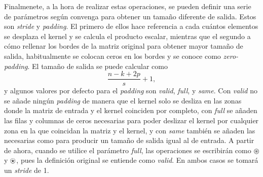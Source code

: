 		Finalmenete, a la hora de realizar estas operaciones, se pueden definir una serie de parámetros según convenga para obtener un tamaño diferente de salida\cite{introCNN}. Estos son \textit{stride} y \textit{padding}. El primero de ellos hace referencia a cada cuántos elementos se desplaza el kernel y se calcula el producto escalar, mientras que el segundo a cómo rellenar los bordes de la matriz original para obtener mayor tamaño de salida, habitualmente se colocan ceros en los bordes y se conoce como \textit{zero-padding}. El tamaño de salida se puede calcular como 
		$$
		\frac{n-k+2p}{s}+1, 
		$$
		y algunos valores por defecto para el \textit{padding} son \textit{valid},  \textit{full}, y \textit{same}. Con \textit{valid} no se añade ningún \textit{padding} de manera que el kernel solo se desliza en las zonas donde la matriz de entrada y el kernel coinciden por completo, con \textit{full} se añaden las filas y columnas de ceros necesarias para poder deslizar el kernel por cualquier zona en la que coincidan la matriz y el kernel, y con \textit{same} también se añaden las necesarias como para producir un tamaño de salida igual al de entrada. A partir de ahora, cuando se utilice el parámetro \textit{full}, las operaciones se escribirán como $\circledast$ y $\ostar$, pues la definición original se entiende como \textit{valid}. En ambos casos se tomará un \textit{stride} de 1. 